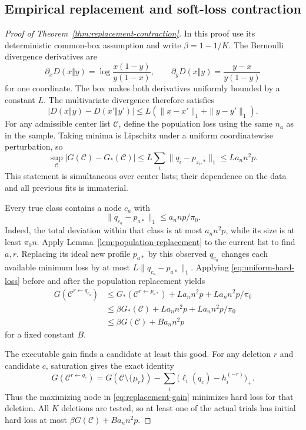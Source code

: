 \subsection{Empirical replacement and soft-loss contraction}
\begin{proof}[Proof of Theorem~\ref{thm:replacement-contraction}]
In this proof use its deterministic common-box assumption and write $\beta=1-1/K$. The Bernoulli divergence derivatives are
\[
 \partial_xD(x\Vert y)=\log\frac{x(1-y)}{y(1-x)},\qquad
 \partial_yD(x\Vert y)=\frac{y-x}{y(1-y)}
\]
for one coordinate. The box makes both derivatives uniformly bounded by a constant $L$. The multivariate divergence therefore satisfies
\[
 |D(x\Vert y)-D(x'\Vert y')|
 \le L(\|x-x'\|_1+\|y-y'\|_1).
\]
For any admissible center list $\mathcal C$, define the population loss using the same $n_a$ as in the sample. Taking minima is Lipschitz under a uniform coordinatewise perturbation, so
\begin{equation}
 \sup_{\mathcal C}|G(\mathcal C)-G_*(\mathcal C)|
   \le L\sum_i\|q_i-p_{z_i,*}\|_1
   \le La_n n^2p.
 \label{eq:uniform-hard-loss}
\end{equation}
This statement is simultaneous over center lists; their dependence on the data and all previous fits is immaterial.

Every true class contains a node $c_a$ with
\begin{equation}
 \|q_{c_a}-p_{a*}\|_1\le a_n np/\pi_0.
 \label{eq:available-good-candidate}
\end{equation}
Indeed, the total deviation within that class is at most $a_n n^2p$, while its size is at least $\pi_0n$. Apply Lemma~\ref{lem:population-replacement} to the current list to find $a,r$. Replacing its ideal new profile $p_{a*}$ by this observed $q_{c_a}$ changes each available minimum loss by at most $L\|q_{c_a}-p_{a*}\|_1$. Applying \eqref{eq:uniform-hard-loss} before and after the population replacement yields
\begin{align*}
 G(\mathcal C^{r\leftarrow q_{c_a}})
 &\le G_*(\mathcal C^{r\leftarrow p_{a*}})
             +La_n n^2p+La_n n^2p/\pi_0\\
 &\le\beta G_*(\mathcal C)+La_n n^2p+La_n n^2p/\pi_0\\
 &\le\beta G(\mathcal C)+Ba_n n^2p
\end{align*}
for a fixed constant $B$.

The executable gain finds a candidate at least this good. For any deletion $r$ and candidate $c$, saturation gives the exact identity
\begin{equation}
 G(\mathcal C^{r\leftarrow q_c})
  =G(\mathcal C\setminus\{\mu_r\})
     -\sum_i\bigl(\ell_i(q_c)-h_i^{(-r)}\bigr)_+.
 \label{eq:gain-hard-loss-identity}
\end{equation}
Thus the maximizing node in \eqref{eq:replacement-gain} minimizes hard loss for that deletion. All $K$ deletions are tested, so at least one of the actual trials has initial hard loss at most $\beta G(\mathcal C)+Ba_n n^2p$.


\end{proof}
